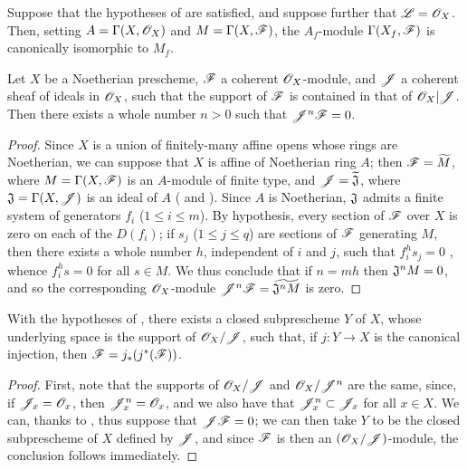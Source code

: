 \begin{cor}[9.3.3]
\label{1.9.3.3}
Suppose that the hypotheses of  are satisfied, and suppose further that
$\mathscr{L}=\mathscr{O}_X$. Then, setting $A=\Gamma(X,\mathscr{O}_X)$ and $M=\Gamma(X,\mathscr{F})$, the $A_f$-module
$\Gamma(X_f,\mathscr{F})$ is canonically isomorphic to $M_f$.
\end{cor}

\begin{prop}[9.3.4]
\label{1.9.3.4}
Let $X$ be a Noetherian prescheme, $\mathscr{F}$ a coherent $\mathscr{O}_X$-module, and $\mathscr{J}$ a
coherent sheaf of ideals in $\mathscr{O}_X$, such that the support of $\mathscr{F}$ is contained in that
of $\mathscr{O}_X|\mathscr{J}$. Then there exists a whole number $n>0$ such that $\mathscr{J}^n\mathscr{F}=0$.
\end{prop}

\begin{proof}
\label{proof-1.9.3.4}
Since $X$ is a union of finitely-many affine opens whose rings are Noetherian, we can suppose
that $X$ is affine of Noetherian ring $A$; then $\mathscr{F}=\widetilde{M}$, where
$M=\Gamma(X,\mathscr{F})$ is an $A$-module of finite type, and $\mathscr{J}=\widetilde{\mathfrak{J}}$,
where $\mathfrak{J}=\Gamma(X,\mathscr{J})$ is an ideal of $A$ ( and
). Since $A$ is Noetherian, $\mathfrak{J}$ admits a finite system of
generators $f_i$ ($1\leqslant i\leqslant m$). By hypothesis, every section of $\mathscr{F}$ over
$X$ is zero on each of the $D(f_i)$; if $s_j$ ($1\leqslant j\leqslant q$) are sections of
$\mathscr{F}$ generating $M$, then there exists a whole number $h$, independent of $i$ and $j$,
such that $f_i^h s_j=0$ , whence $f_i^h s=0$ for all $s\in M$. We thus
conclude that if $n=mh$ then $\mathfrak{J}^n M=0$, and so the corresponding $\mathscr{O}_X$-module
$\mathscr{J}^n\mathscr{F}=\widetilde{\mathfrak{J}^n M}$  is zero.
\end{proof}

\begin{cor}[9.3.5]
\label{1.9.3.5}
With the hypotheses of , there exists a closed subprescheme $Y$ of $X$,
whose underlying space is the support of $\mathscr{O}_X/\mathscr{J}$, such that, if $j:Y\to X$ is the
canonical injection, then $\mathscr{F}=j_*(j^*(\mathscr{F}))$.
\end{cor}

\begin{proof}
\label{proof-1.9.3.5}
First, note that the supports of $\mathscr{O}_X/\mathscr{J}$ and $\mathscr{O}_X/\mathscr{J}^n$ are the same,
since, if $\mathscr{J}_x=\mathscr{O}_x$, then $\mathscr{J}_x^n=\mathscr{O}_x$, and we also have that
$\mathscr{J}_x^n\subset\mathscr{J}_x$ for all $x\in X$. We can, thanks to , thus
suppose that $\mathscr{J}\mathscr{F}=0$; we can then take $Y$ to be the closed subprescheme of $X$
defined by $\mathscr{J}$, and since $\mathscr{F}$ is then an $(\mathscr{O}_X/\mathscr{J})$-module, the conclusion
follows immediately.
\end{proof}

